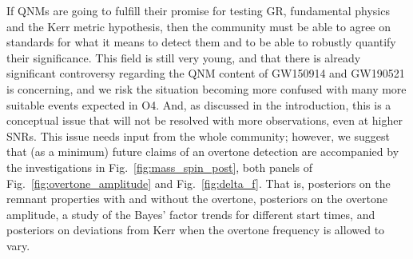 If QNMs are going to fulfill their promise for testing GR, fundamental physics and the Kerr metric hypothesis, then the community must be able to agree on standards for what it means to detect them and to be able to robustly quantify their significance. 
This field is still very young, and that there is already significant controversy regarding the QNM content of GW150914 and GW190521 is concerning, and we risk the situation becoming more confused with many more suitable events expected in O4.
And, as discussed in the introduction, this is a conceptual issue that will not be resolved with more observations, even at higher SNRs.
This issue needs input from the whole community; however, we suggest that (as a minimum) future claims of an overtone detection are accompanied by the investigations in Fig.~\ref{fig:mass_spin_post}, both panels of Fig.~\ref{fig:overtone_amplitude} and Fig.~\ref{fig:delta_f}.
That is, posteriors on the remnant properties with and without the overtone, posteriors on the overtone amplitude, a study of the Bayes' factor trends for different start times, and posteriors on deviations from Kerr when the overtone frequency is allowed to vary.